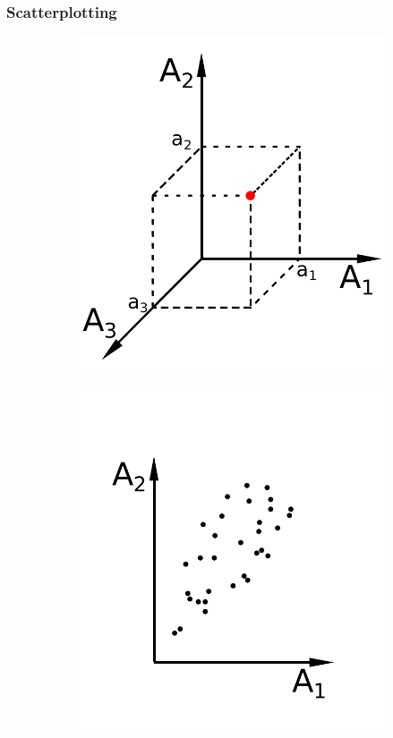 \documentclass[a4paper,fontsize=12pt,toc=bib,halfparskip]{scrartcl}
\begin{document}
\subsubsection{Scatterplotting}
\begin{figure}
	\hspace{2cm}
	\begin{subfigure}{0.30\textwidth}
		\includegraphics[width=\textwidth]{pictures/Scatterplot3D}
		\caption{}
	\end{subfigure}
	\hfill
	\begin{subfigure}{0.30\textwidth}
		\includegraphics[width=\textwidth]{pictures/Scatterplot2D}

\end{subfigure}
\end{figure}
\end{document}
